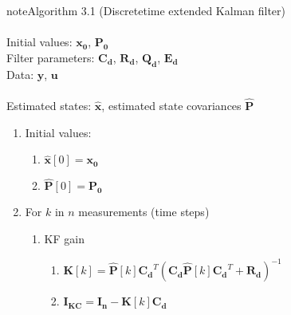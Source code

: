 \label{04.01_EK:ek-algorithm} 
\noindent\begin{sphinxadmonition}{note}{Algorithm 3.1 (Discrete\sphinxhyphen{}time extended Kalman filter)} \\
 \\
\hspace*{0.5cm} Initial values: \(\mathbf{x_0}\), \(\mathbf{P_0}\) \\
\hspace*{0.5cm} Filter parameters: \(\mathbf{C_d}\), \(\mathbf{R_d}\), \(\mathbf{Q_d}\), \(\mathbf{E_d}\) \\
\hspace*{0.5cm} Data: \(\mathbf{y}\), \(\mathbf{u}\) \\
 \\
\hspace*{0.5cm} Estimated states: \(\mathbf{\hat{x}}\), estimated state covariances \(\mathbf{\hat{P}}\)
\vspace{0.2cm}
\begin{enumerate}
%
\item {} 
Initial values:
\begin{enumerate}
%
\item {} 

\(\mathbf{\hat{x}}[0] = \mathbf{x_0}\)

\item {} 

\(\mathbf{\hat{P}}[0] = \mathbf{P_0}\)

\end{enumerate}

\item {} 

For \(k\) in \(n\) measurements (time steps)
\begin{enumerate}
%
\item {} 

KF gain
\begin{enumerate}
%
\item {} 

\(\mathbf{K}[k]=\mathbf{\hat{P}}[k] \mathbf{C_d}^T \left(\mathbf{C_d} \mathbf{\hat{P}}[k] \mathbf{C_d}^T + \mathbf{R_d}\right)^{-1}\)

\item {} 

\(\mathbf{I_{KC}} = \mathbf{I_n} - \mathbf{K}[k] \mathbf{C_d}\)


\end{enumerate}
\end{enumerate}
\end{enumerate}
\end{sphinxadmonition}
